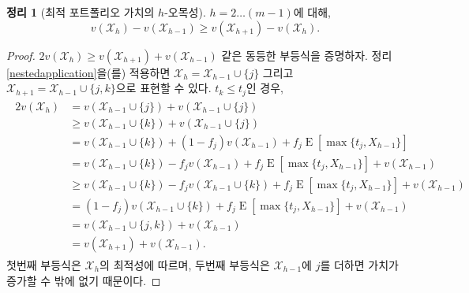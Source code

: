 \documentclass[11pt]{article} %
\newif\ifen
\newtheorem{theorem}{Theorem}
\theoremstyle{definition}
\newtheorem{theorem}{정리}
\theoremstyle{definition}
\begin{document}
\begin{theorem}[\ifen Optimal portfolio valuation concave in $h$\else 최적 포트폴리오 가치의 $h$-오목성\fi] \label{concavityinh}
\ifen For $h = 2 \dots (m-1)$,
\else $h = 2 \dots (m-1)$에 대해,\fi
\begin{equation}v(\mathcal{X}_h) - v(\mathcal{X}_{h-1}) \geq v(\mathcal{X}_{h+1}) - v(\mathcal{X}_{h}).\end{equation} 
\end{theorem}
\begin{proof}
\ifen We will prove the equivalent expression $2 v(\mathcal{X}_h) \geq v(\mathcal{X}_{h+1}) + v(\mathcal{X}_{h-1})$. Applying Theorem \ref{nestedapplication}, we write $\mathcal{X}_h = \mathcal{X}_{h-1} \cup\{j\}$ and $\mathcal{X}_{h+1} = \mathcal{X}_{h-1} \cup\{j, k\}$. If $t_k \leq t_j$, then 
\else $2 v(\mathcal{X}_h) \geq v(\mathcal{X}_{h+1}) + v(\mathcal{X}_{h-1})$ 같은 동등한 부등식을 증명하자. 정리 \ref{nestedapplication}을(를) 적용하면 $ \mathcal{X}_h = \mathcal{X}_{h-1} \cup\{j\}$ 그리고 $\mathcal{X}_{h+1} = \mathcal{X}_{h-1} \cup\{j, k\}$으로 표현할 수 있다. $t_k \leq t_j$인 경우, \fi
\begin{align}
\begin{split}
2 v(\mathcal{X}_h) &= v(\mathcal{X}_{h-1} \cup\{j\}) + v(\mathcal{X}_{h-1} \cup\{j\}) \\
&\geq v(\mathcal{X}_{h-1} \cup\{k\}) + v(\mathcal{X}_{h-1} \cup\{j\}) \\
&= v(\mathcal{X}_{h-1} \cup\{k\}) + (1 - f_j) v(\mathcal{X}_{h-1}) + f_j \operatorname{E}[\max\{t_j, X_{h-1}\}] \\
&= v(\mathcal{X}_{h-1} \cup\{k\}) - f_j v(\mathcal{X}_{h-1}) + f_j \operatorname{E}[\max\{t_j, X_{h-1}\}] + v(\mathcal{X}_{h-1})  \\
&\geq v(\mathcal{X}_{h-1} \cup\{k\})  - f_j v(\mathcal{X}_{h-1}\cup\{k\}) + f_j \operatorname{E}[\max\{t_j, X_{h-1}\}]+ v(\mathcal{X}_{h-1})\\
&= (1 - f_j) v(\mathcal{X}_{h-1} \cup\{k\})  + f_j \operatorname{E}[\max\{t_j, X_{h-1}\}]+ v(\mathcal{X}_{h-1})\\
&=  v(\mathcal{X}_{h-1} \cup\{j, k\}) + v(\mathcal{X}_{h-1})\\
&=  v(\mathcal{X}_{h+1}) + v(\mathcal{X}_{h-1}).
\end{split} 
\end{align}
\ifen The first inequality follows from the optimality of $\mathcal{X}_h$, while the second follows from the fact that adding $k$ to $\mathcal{X}_{h-1}$ can only increase its valuation.
\else 첫번째 부등식은 $\mathcal{X}_h$의 최적성에 따르며, 두번째 부등식은 $\mathcal{X}_{h-1}$에 $j$를 더하면 가치가 증가할 수 밖에 없기 때문이다.\fi


\end{proof}
\end{document}
